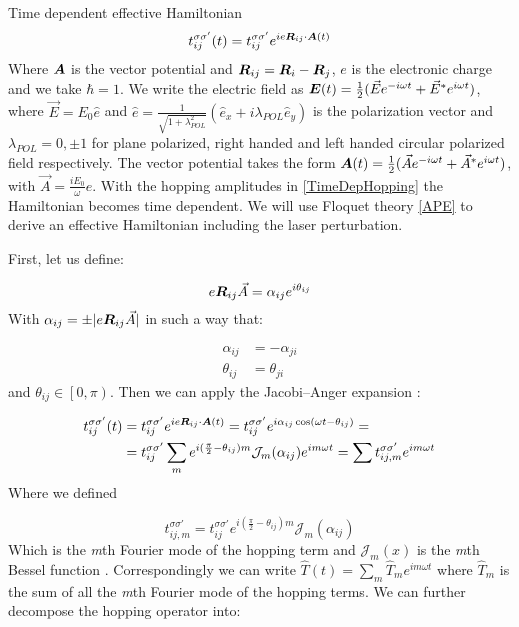 \begin{section}{Time dependent effective Hamiltonian}
\begin{equation}
\label{TimeDepHopping}
t_{ij}^{\sigma \sigma'}(t) = t_{ij}^{\sigma \sigma'} e^{ie\boldsymbol{R}_{ij}\cdot\boldsymbol{A}(t)}
\end{equation}
Where $\boldsymbol{A}$ is the vector potential and $\boldsymbol{R}_{ij} = \boldsymbol{R}_i-\boldsymbol{R}_j$, $e$ is the electronic charge and we take $\hbar=1$. We write the electric field as $\boldsymbol{E}(t) = \frac{1}{2}(\vec{E}e^{-i\omega t}+\vec{E}^*e^{i\omega t})$, where $\vec{E} = E_0\hat{e}$ and $\hat{e} = \frac{1}{\sqrt{1+\lambda_{POL}^2}}(\hat{e}_x+i\lambda_{POL}\hat{e}_y)$ is the polarization vector and $\lambda_{POL} = 0, \pm 1$ for plane polarized, right handed and left handed circular polarized field respectively. The vector potential takes the form $\boldsymbol{A}(t) = \frac{1}{2}(\vec{A}e^{-i\omega t} + \vec{A}^* e^{i\omega t})$, with $\vec{A} = \frac{iE_0}{\omega}\hat{e}$.
With the hopping amplitudes in \ref{TimeDepHopping} the Hamiltonian becomes time dependent. We will use Floquet theory \ref{APE} to derive an effective Hamiltonian including the laser perturbation.

First, let us define:

\begin{equation}
\label{Def_alpha}
e\boldsymbol{R}_{ij}\vec{A} = \alpha_{ij} e^{i \theta_{ij}}
\end{equation}
With $\alpha_{ij} = \pm|e\boldsymbol{R}_{ij}\vec{A}|$ in such a way that:

\begin{align}
\alpha_{ij} &= -\alpha_{ji} \label{alphaSym} \\
\theta_{ij} &= \theta_{ji} \label{thetaSym}
\end{align}
and $\theta_{ij} \in \left[0,\pi\right)$. Then we can apply the Jacobi–Anger expansion \cite{Korsch2006}:

\begin{align*}
t_{ij}^{\sigma \sigma'}(t) &= t_{ij}^{\sigma \sigma'}e^{ie\boldsymbol{R}_{ij}\cdot\boldsymbol{A}(t)} = t_{ij}^{\sigma \sigma'}e^{i\alpha_{ij} \cos(\omega t - \theta_{ij})} = \\
&= t_{ij}^{\sigma \sigma'}\sum_m e^{i(\frac{\pi}{2}-\theta_{ij})m} \mathcal{J}_m(\alpha_{ij}) e^{im\omega t} = \sum t_{ij,m}^{\sigma \sigma'} e^{im\omega t}
\end{align*}
Where we defined 

\begin{equation}
\label{HoppAmpFourier}
t_{ij,m}^{\sigma \sigma'} = t_{ij}^{\sigma \sigma'} e^{i(\frac{\pi}{2}-\theta_{ij})m} \mathcal{J}_m(\alpha_{ij})
\end{equation}
Which is the \textit{m}th Fourier mode of the hopping term and $\mathcal{J}_m(x)$ is the \textit{m}th Bessel function \cite{Kitamura2017}. Correspondingly we can write $\hat{T}(t) = \sum_m \hat{T}_m e^{im \omega t}$ where $\hat{T}_m$ is the sum of all the \textit{m}th Fourier mode of the hopping terms. We can further decompose the hopping operator into:


\end{section}
